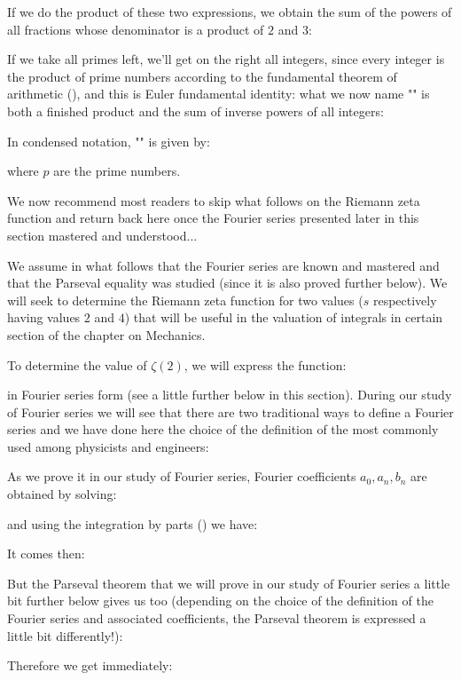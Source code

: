 	If we do the product of these two expressions, we obtain the sum of the powers of all fractions whose denominator is a product of $2$ and $3$:
	
	If we take all primes left, we'll get on the right all integers, since every integer is the product of prime numbers according to the fundamental theorem of arithmetic (), and this is Euler fundamental identity: what we now name "" is both a finished product and the sum of inverse powers of all integers:
	
	In condensed notation, "" is given by:
	
	where $p$ are the prime numbers.
	
	We now recommend most readers to skip what follows on the Riemann zeta function and return back here once the Fourier series presented later in this section mastered and understood...
	
	We assume in what follows that the Fourier series are known and mastered and that the Parseval equality was studied (since it is also proved further below). We will seek to determine the Riemann zeta function for two values ($s$ respectively having values $2$ and $4$) that will be useful in the valuation of integrals in certain section of the chapter on Mechanics.
	
	To determine the value of $\zeta (2)$, we will express the function:
	
	in Fourier series form (see a little further below in this section). During our study of Fourier series we will see that there are two traditional ways to define a Fourier series and we have done here the choice of the definition of the most commonly used among physicists and engineers:
	
	As we prove it in our study of Fourier series, Fourier coefficients $a_0,a_n,b_n$ are obtained by solving:
	
	and using the integration by parts () we have:
	
	It comes then:
	
	But the Parseval theorem that we will prove in our study of Fourier series a little bit further below gives us too (depending on the choice of the definition of the Fourier series and associated coefficients, the Parseval theorem is expressed a little bit differently!):
	
	Therefore we get immediately:
	
